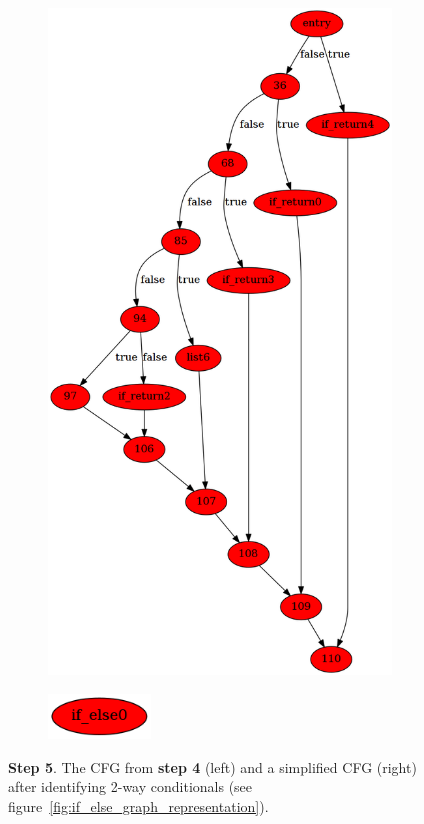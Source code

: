 \begin{figure}[htbp]
	\centering
	\begin{subfigure}[ht]{0.45\textwidth}
		\includegraphics[width=\textwidth]{inc/appendices/control_flow_analysis_example/step5_before.png}
	\end{subfigure}
	\qquad
	\begin{subfigure}[ht]{0.45\textwidth}
		\centering
		\includegraphics[width=0.3\textwidth]{inc/appendices/control_flow_analysis_example/step5_after.png}
	\end{subfigure}
	\caption{\textbf{Step 5}. The CFG from \textbf{step 4} (left) and a simplified CFG (right) after identifying 2-way conditionals (see figure~\ref{fig:if_else_graph_representation}).}
	\label{fig:step_5}
\end{figure}
